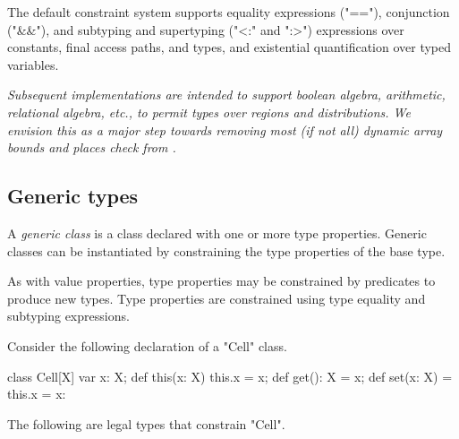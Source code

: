The default \Xten{} constraint system supports equality expressions
(\xcd"=="), conjunction (\xcd"&&"), and subtyping and supertyping (\xcd"<:" and
\xcd":>") expressions over constants, final access paths, and
types, and existential quantification over typed variables.

\emph{
Subsequent implementations are intended to support boolean algebra,
arithmetic, relational algebra, etc., to permit types over regions and
distributions. We envision this as a major step towards removing most
(if not all) dynamic array bounds and places check from \Xten{}.
}


\subsection{Generic types}
\label{Generics}

        A {\em generic class} is a class
        declared with one or more type properties.  Generic
        classes can be instantiated by constraining the type
        properties of the base type.

As with value properties, type properties may be constrained
by predicates to produce new types.
Type properties are constrained using type equality and
subtyping expressions.

Consider the following declaration of a \xcd"Cell" class.
\begin{xten}
class Cell[X] {
    var x: X;
    def this(x: X) { this.x = x; }
    def get(): X = x;
    def set(x: X) = { this.x = x: }
}
\end{xten}
The following are legal types that constrain \xcd"Cell".

